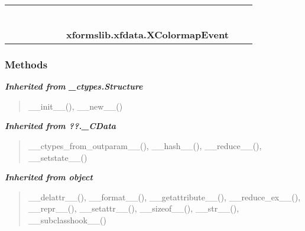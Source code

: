     \label{xformslib:xfdata:XColormapEvent}
\begin{tabular}{cccccccccc}
\multicolumn{2}{r}{\settowidth{\BCL}{object}\multirow{2}{\BCL}{object}}
&&
&&
&&
  \\\cline{3-3}
  &&\multicolumn{1}{c|}{}
&&
&&
&&
  \\
\multicolumn{4}{r}{\settowidth{\BCL}{??.\_CData}\multirow{2}{\BCL}{??.\_CData}}
&&
&&
  \\\cline{5-5}
  &&&&\multicolumn{1}{c|}{}
&&
&&
  \\
\multicolumn{6}{r}{\settowidth{\BCL}{\_ctypes.Structure}\multirow{2}{\BCL}{\_ctypes.Structure}}
&&
  \\\cline{7-7}
  &&&&&&\multicolumn{1}{c|}{}
&&
  \\
&&&&&&\multicolumn{2}{l}{\textbf{xformslib.xfdata.XColormapEvent}}
\end{tabular}



  \subsubsection{Methods}


\large{\textbf{\textit{Inherited from \_ctypes.Structure}}}

\begin{quote}
\_\_init\_\_(), \_\_new\_\_()
\end{quote}

\large{\textbf{\textit{Inherited from ??.\_CData}}}

\begin{quote}
\_\_ctypes\_from\_outparam\_\_(), \_\_hash\_\_(), \_\_reduce\_\_(), \_\_setstate\_\_()
\end{quote}

\large{\textbf{\textit{Inherited from object}}}

\begin{quote}
\_\_delattr\_\_(), \_\_format\_\_(), \_\_getattribute\_\_(), \_\_reduce\_ex\_\_(), \_\_repr\_\_(), \_\_setattr\_\_(), \_\_sizeof\_\_(), \_\_str\_\_(), \_\_subclasshook\_\_()
\end{quote}

